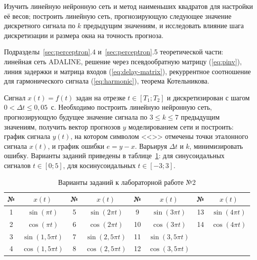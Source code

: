 
Изучить линейную нейронную сеть и метод наименьших квадратов для настройки её весов; построить
линейную сеть, прогнозирующую следующее значение дискретного сигнала по $k$ предыдущим значениям, и
исследовать влияние шага дискретизации и размера окна на точность прогноза.

Подразделы~\ref{sec:perceptron}.4 и~\ref{sec:perceptron}.5 теоретической части: линейная сеть ADALINE,
решение через псевдообратную матрицу (\ref{eq:pinv}), линия задержки и матрица входов
(\ref{eq:delay-matrix}), рекуррентное соотношение для гармонического сигнала (\ref{eq:harmonic}),
теорема Котельникова.

Сигнал $x(t) = f(t)$ задан на отрезке $t \in [T_1; T_2]$ и дискретизирован с шагом $0 < \Delta t \le 0,05$~с.
Необходимо построить линейную нейронную сеть, прогнозирующую будущее значение сигнала по $3 \le k \le 7$
предыдущим значениям, получить вектор прогнозов $y$ моделированием сети и построить:
график сигнала $y(t)$, на котором символом <<\code{*}>> отмечены точки эталонного сигнала $x(t)$, и
график ошибки $e = y - x$. Варьируя $\Delta t$ и $k$, минимизировать ошибку. Варианты заданий приведены
в таблице~\ref{tab:l2-var}: для синусоидальных сигналов $t \in [0; 5]$, для косинусоидальных
$t \in [-3; 3]$.

\begin{table}[!htb]
\caption{Варианты заданий к лабораторной работе №2}
\label{tab:l2-var}
\centering\small
\begin{tabular}{cc|cc|cc|cc}
\toprule
№ & $x(t)$ & № & $x(t)$ & № & $x(t)$ & № & $x(t)$ \\
\midrule
1 & $\sin(\pi t)$     & 5 & $\sin(2\pi t)$   & 9  & $\sin(3\pi t)$   & 13 & $\sin(4\pi t)$ \\
2 & $\cos(\pi t)$     & 6 & $\cos(2\pi t)$   & 10 & $\cos(3\pi t)$   & 14 & $\cos(4\pi t)$ \\
3 & $\sin(1,5\pi t)$  & 7 & $\sin(2,5\pi t)$ & 11 & $\sin(3,5\pi t)$ &    & \\
4 & $\cos(1,5\pi t)$  & 8 & $\cos(2,5\pi t)$ & 12 & $\cos(3,5\pi t)$ &    & \\
\bottomrule
\end{tabular}
\end{table}

